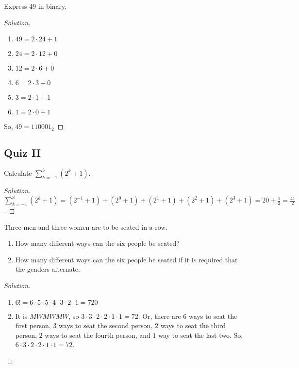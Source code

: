 \documentclass[../main.tex]{subfiles}
\begin{document}
\begin{problem}
Express $49$ in binary.
\end{problem}
\begin{proof}[Solution]
\
\begin{enumerate}
\item[] $49 = 2\cdot 24+1$
\item[] $24 = 2\cdot 12+0$
\item[] $12 = 2\cdot 6+0$
\item[] $6 = 2\cdot 3 + 0$
\item $3 = 2\cdot 1 + 1$
\item $1 = 2\cdot 0 + 1$
\end{enumerate}
So, $49 = 110001_{2}$
\end{proof} 
%
\subsection{Quiz II}
%
\begin{problem}
Calculate $\sum_{k=-1}^{3} (2^k+1)$.
\end{problem}
\begin{proof}[Solution]
$\sum_{k=-1}^{3}(2^k+1) = (2^{-1}+1) + (2^0+1) + (2^1+1)+(2^2+1) + (2^3+1) = 20 +\frac{1}{2} = \frac{41}{2}$.
\end{proof}

\begin{problem}
Three men and three women are to be seated in a row.
\begin{enumerate}
\item How many different ways can the six people be seated?
\item How many different ways can the six people be seated if it is required that the genders alternate.
\end{enumerate}
\end{problem}
\begin{proof}[Solution]
\
\begin{enumerate}
\item $6! = 6\cdot 5 \cdot 5 \cdot 4 \cdot 3 \cdot 2 \cdot 1 = 720$
\item It is $MWMWMW$, so $3\cdot 3 \cdot 2 \cdot 2 \cdot 1 \cdot 1 = 72$. Or, there are $6$ ways to seat the first person, $3$ ways to seat the second person, $2$ ways to seat the third person, $2$ ways to seat the fourth person, and $1$ way to seat the last two. So, $6\cdot 3 \cdot 2 \cdot 2 \cdot 1 \cdot 1 = 72$.
\end{enumerate}
\end{proof}
\end{document}
